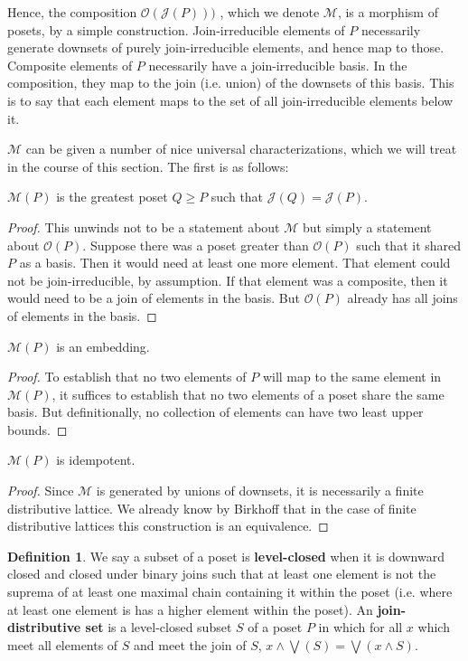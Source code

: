 \documentclass[hoptionsi,review,format=sigplan]{acmart}
\theoremstyle{definition}
\newtheorem{definition}{Definition}[section]
\newcommand{\Mcc}{\mathcal{M}}
\newcommand{\Oc}{\mathcal{O}}
\newcommand{\Jc}{\mathcal{J}}
\begin{document}
Hence, the composition \(\Oc(\Jc(P)))\) , which we denote \(\Mcc\), is a morphism of posets, by a simple construction. Join-irreducible elements of \(P\) necessarily generate downsets of purely join-irreducible elements, and hence map to those. Composite elements of \(P\) necessarily have a join-irreducible basis. In the composition, they map to the join (i.e. union) of the downsets of this basis. This is to say that each element maps to the set of all join-irreducible elements below it.

\(\Mcc\) can be given a number of nice universal characterizations, which we will treat in the course of this section. The first is as follows:

\begin{lemma}
\(\Mcc(P)\) is the greatest poset \(Q \ge P\) such that \(\Jc(Q) = \Jc(P)\).
\end{lemma}
\begin{proof}
This unwinds not to be a statement about \(\Mcc\) but simply a statement about \(\Oc(P)\).  Suppose there was a poset greater than \(\Oc(P)\) such that it shared \(P\) as a basis. Then it would need at least one more element. That element could not be join-irreducible, by assumption. If that element was a composite, then it would need to be a join of elements in the basis. But \(\Oc(P)\) already has all joins of elements in the basis.
\end{proof}

\begin{lemma}
\(\Mcc(P)\) is an embedding.
\end{lemma}
\begin{proof}
To establish that no two elements of \(P\) will map to the same element in \(\Mcc(P)\), it suffices to establish that no two elements of a poset share the same basis. But definitionally, no collection of elements can have two least upper bounds.
\end{proof}

\begin{lemma}
\(\Mcc(P)\) is idempotent.
\end{lemma}
\begin{proof}
Since \(\Mcc\) is generated by unions of downsets, it is necessarily a finite distributive lattice. We already know by Birkhoff that in the case of finite distributive lattices this construction is an equivalence.
\end{proof}

\begin{definition}
We say a subset of a poset is \textbf{level-closed} when it is downward closed and closed under binary joins such that at least one element is not the suprema of at least one maximal chain containing it within the poset (i.e. where at least one element is has a higher element within the poset). An \textbf{join-distributive set} is a level-closed subset \(S\) of a poset \(P\) in which for all \(x\) which meet all elements of \(S\) and meet the join of \(S\), \(x \wedge \bigvee(S) = \bigvee(x \wedge S)\).
\end{definition}
\end{document}
